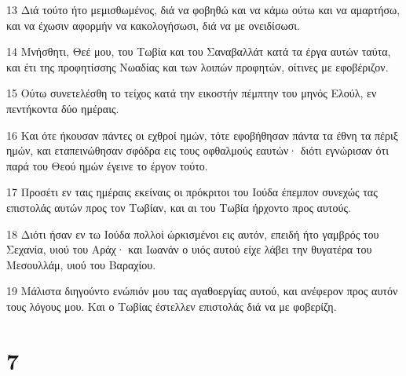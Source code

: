 \par 13 Διά τούτο ήτο μεμισθωμένος, διά να φοβηθώ και να κάμω ούτω και να αμαρτήσω, και να έχωσιν αφορμήν να κακολογήσωσι, διά να με ονειδίσωσι.
\par 14 Μνήσθητι, Θεέ μου, του Τωβία και του Σαναβαλλάτ κατά τα έργα αυτών ταύτα, και έτι της προφητίσσης Νωαδίας και των λοιπών προφητών, οίτινες με εφοβέριζον.
\par 15 Ούτω συνετελέσθη το τείχος κατά την εικοστήν πέμπτην του μηνός Ελούλ, εν πεντήκοντα δύο ημέραις.
\par 16 Και ότε ήκουσαν πάντες οι εχθροί ημών, τότε εφοβήθησαν πάντα τα έθνη τα πέριξ ημών, και εταπεινώθησαν σφόδρα εις τους οφθαλμούς εαυτών· διότι εγνώρισαν ότι παρά του Θεού ημών έγεινε το έργον τούτο.
\par 17 Προσέτι εν ταις ημέραις εκείναις οι πρόκριτοι του Ιούδα έπεμπον συνεχώς τας επιστολάς αυτών προς τον Τωβίαν, και αι του Τωβία ήρχοντο προς αυτούς.
\par 18 Διότι ήσαν εν τω Ιούδα πολλοί ώρκισμένοι εις αυτόν, επειδή ήτο γαμβρός του Σεχανία, υιού του Αράχ· και Ιωανάν ο υιός αυτού είχε λάβει την θυγατέρα του Μεσουλλάμ, υιού του Βαραχίου.
\par 19 Μάλιστα διηγούντο ενώπιόν μου τας αγαθοεργίας αυτού, και ανέφερον προς αυτόν τους λόγους μου. Και ο Τωβίας έστελλεν επιστολάς διά να με φοβερίζη.

\chapter{7}

